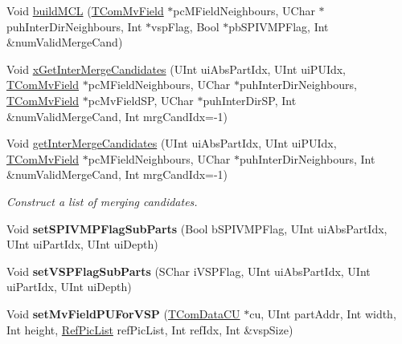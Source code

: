 \begin{DoxyCompactItemize}
\item 
Void \hyperlink{class_t_com_data_c_u_aa6997f12cfa3d044ba4e0dc4085dca1d}{build\+M\+CL} (\hyperlink{class_t_com_mv_field}{T\+Com\+Mv\+Field} $\ast$pc\+M\+Field\+Neighbours, U\+Char $\ast$puh\+Inter\+Dir\+Neighbours, Int $\ast$vsp\+Flag, Bool $\ast$pb\+S\+P\+I\+V\+M\+P\+Flag, Int \&num\+Valid\+Merge\+Cand)
\item 
Void \hyperlink{class_t_com_data_c_u_a9aa2ec0457f496a32d365b05337c50a9}{x\+Get\+Inter\+Merge\+Candidates} (U\+Int ui\+Abs\+Part\+Idx, U\+Int ui\+P\+U\+Idx, \hyperlink{class_t_com_mv_field}{T\+Com\+Mv\+Field} $\ast$pc\+M\+Field\+Neighbours, U\+Char $\ast$puh\+Inter\+Dir\+Neighbours, \hyperlink{class_t_com_mv_field}{T\+Com\+Mv\+Field} $\ast$pc\+Mv\+Field\+SP, U\+Char $\ast$puh\+Inter\+Dir\+SP, Int \&num\+Valid\+Merge\+Cand, Int mrg\+Cand\+Idx=-\/1)
\item 
\mbox{\label{class_t_com_data_c_u_abcec83a63c8c2821b9f588d925d43990}} 
Void \hyperlink{class_t_com_data_c_u_abcec83a63c8c2821b9f588d925d43990}{get\+Inter\+Merge\+Candidates} (U\+Int ui\+Abs\+Part\+Idx, U\+Int ui\+P\+U\+Idx, \hyperlink{class_t_com_mv_field}{T\+Com\+Mv\+Field} $\ast$pc\+M\+Field\+Neighbours, U\+Char $\ast$puh\+Inter\+Dir\+Neighbours, Int \&num\+Valid\+Merge\+Cand, Int mrg\+Cand\+Idx=-\/1)
\begin{DoxyCompactList}\small\item\em Construct a list of merging candidates. \end{DoxyCompactList}\item 
\mbox{\label{class_t_com_data_c_u_af2b5b70b81ba544a1571fad0a59627eb}} 
Void {\bfseries set\+S\+P\+I\+V\+M\+P\+Flag\+Sub\+Parts} (Bool b\+S\+P\+I\+V\+M\+P\+Flag, U\+Int ui\+Abs\+Part\+Idx, U\+Int ui\+Part\+Idx, U\+Int ui\+Depth)
\item 
\mbox{\label{class_t_com_data_c_u_a52fe9922512902f6e4df42ee92841055}} 
Void {\bfseries set\+V\+S\+P\+Flag\+Sub\+Parts} (S\+Char i\+V\+S\+P\+Flag, U\+Int ui\+Abs\+Part\+Idx, U\+Int ui\+Part\+Idx, U\+Int ui\+Depth)
\item 
\mbox{\label{class_t_com_data_c_u_a60b1e8cfaf79c9df4e25e6f2b7d46c1e}} 
Void {\bfseries set\+Mv\+Field\+P\+U\+For\+V\+SP} (\hyperlink{class_t_com_data_c_u}{T\+Com\+Data\+CU} $\ast$cu, U\+Int part\+Addr, Int width, Int height, \hyperlink{_type_def_8h_a93cea48eb9dcfd661168dee82e41b384}{Ref\+Pic\+List} ref\+Pic\+List, Int ref\+Idx, Int \&vsp\+Size)

\end{DoxyCompactItemize}
